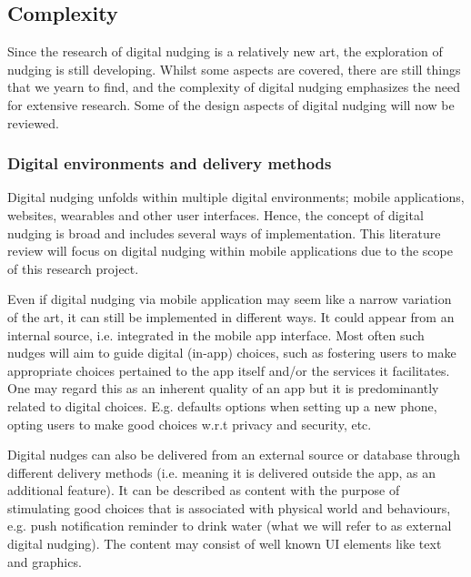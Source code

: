 
\subsection{Complexity}
Since the research of digital nudging is a relatively new art, the exploration of nudging is still developing. Whilst some aspects are covered, there are still things that we yearn to find, and the complexity of digital nudging emphasizes the need for extensive research. Some of the design aspects of digital nudging will now be reviewed.

\subsubsection{Digital environments and delivery methods}
Digital nudging unfolds within multiple digital environments; mobile applications, websites, wearables and other user interfaces\cite{mirsch_digital_2017}.
Hence, the concept of digital nudging is broad and includes several ways of implementation. This literature review will focus on digital nudging within mobile applications due to the scope of this research project. 

Even if digital nudging via mobile application may seem like a narrow variation of the art, it can still be implemented in different ways. It could appear from an internal source, i.e. integrated in the mobile app interface. Most often such nudges will aim to guide digital (in-app) choices, such as fostering users to make appropriate choices pertained to the app itself and/or the services it facilitates. One may regard this as an inherent quality of an app but it is predominantly related to digital choices. E.g. defaults options when setting up a new phone, opting users to make good choices w.r.t privacy and security, etc.

Digital nudges can also be delivered from an external source or database through different delivery methods (i.e. meaning it is delivered outside the app, as an additional feature). It can be described as content with the purpose of stimulating good choices that is associated with physical world and behaviours, e.g. push notification reminder to drink water (what we will refer to as external digital nudging). The content may consist of well known UI elements like text and graphics. 

